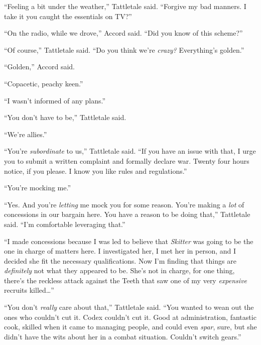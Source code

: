 ``Feeling a bit under the weather,'' Tattletale said.  ``Forgive my bad manners.  I take it you caught the essentials on TV?''



``On the radio, while we drove,'' Accord said.  ``Did you know of this scheme?''



``Of course,'' Tattletale said.  ``Do you think we're \emph{crazy?}  Everything's golden.''



``Golden,'' Accord said.



``Copacetic, peachy keen.''



``I wasn't informed of any plans.''



``You don't have to be,'' Tattletale said.



``We're allies.''



``You're \emph{subordinate }to us,'' Tattletale said.  ``If you have an issue with that, I urge you to submit a written complaint and formally declare war.  Twenty four hours notice, if you please.  I know you like rules and regulations.''



``You're mocking me.''



``Yes.  And you're \emph{letting} me mock you for some reason.  You're making a \emph{lot} of concessions in our bargain here.  You have a reason to be doing that,'' Tattletale said.  ``I'm comfortable leveraging that.''



``I made concessions because I was led to believe that \emph{Skitter} was going to be the one in charge of matters here.  I investigated her, I met her in person, and I decided she fit the necessary qualifications.  Now I'm finding that things are \emph{definitely} not what they appeared to be.  She's not in charge, for one thing, there's the reckless attack against the Teeth that saw one of my very \emph{expensive }recruits killed\ldots''



``You don't \emph{really} care about that,'' Tattletale said.  ``You wanted to wean out the ones who couldn't cut it.  Codex couldn't cut it.  Good at administration, fantastic cook, skilled when it came to managing people, and could even \emph{spar}, sure, but she didn't have the wits about her in a combat situation.  Couldn't switch gears.''



